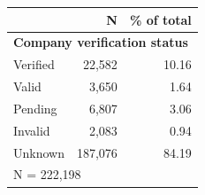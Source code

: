 \begin{tabular}{lrr}


\toprule


 & N & \% of total \\


\midrule


\multicolumn{3}{l}{\textbf{Company verification status}}\\ 
\midrule
Verified            &      22,582&       10.16\\
Valid               &       3,650&        1.64\\
Pending             &       6,807&        3.06\\
Invalid             &       2,083&        0.94\\
Unknown             &     187,076&       84.19\\
\midrule


\multicolumn{3}{l}{\footnotesize N =      222,198}\\


\bottomrule


\end{tabular}


